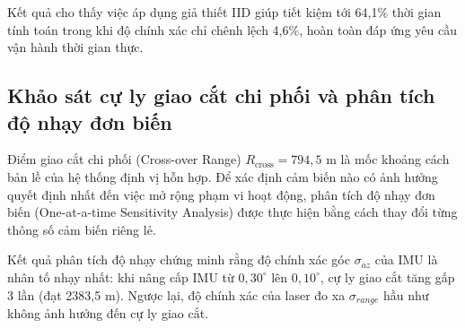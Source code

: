 Kết quả cho thấy việc áp dụng giả thiết IID giúp tiết kiệm tới 64,1\% thời gian tính toán trong khi độ chính xác chỉ chênh lệch 4,6\%, hoàn toàn đáp ứng yêu cầu vận hành thời gian thực.

\subsection{Khảo sát cự ly giao cắt chi phối và phân tích độ nhạy đơn biến}

\hspace{0.5cm} Điểm giao cắt chi phối (Cross-over Range) $R_{\text{cross}} = 794{,}5$ m là mốc khoảng cách bản lề của hệ thống định vị hỗn hợp. Để xác định cảm biến nào có ảnh hưởng quyết định nhất đến việc mở rộng phạm vi hoạt động, phân tích độ nhạy đơn biến (One-at-a-time Sensitivity Analysis) được thực hiện bằng cách thay đổi từng thông số cảm biến riêng lẻ.

\begin{table}[H]
\centering
\caption{Phân tích độ nhạy của cự ly giao cắt $R_{\text{cross}}$ theo từng thông số cảm biến}
\label{tab:crossover-sensitivity-extended}
\end{table}

Kết quả phân tích độ nhạy chứng minh rằng độ chính xác góc $\sigma_{az}$ của IMU là nhân tố nhạy nhất: khi nâng cấp IMU từ $0{,}30^\circ$ lên $0{,}10^\circ$, cự ly giao cắt tăng gấp 3 lần (đạt 2383,5 m). Ngược lại, độ chính xác của laser đo xa $\sigma_{range}$ hầu như không ảnh hưởng đến cự ly giao cắt.

